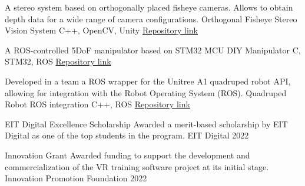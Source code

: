 \documentclass[]{awesome-cv}
\begin{document}
\begin{cventries}
	\cventry
	{A stereo system based on orthogonally placed fisheye cameras. Allows to obtain depth data for a wide range of camera configurations.}
	{Orthogonal Fisheye Stereo Vision System}
	{C++, OpenCV, Unity}
	{\href{https://github.com/QuoZer/fy_lib_source}{Repository link}}%
	{}
	
	\vspace{-3mm}
	\cventry
	{A ROS-controlled 5DoF manipulator based on STM32 MCU}
	{DIY Manipulator}
	{C, STM32, ROS}
	{\href{https://github.com/QuoZer/Tertiarm\_ROS-STM}{Repository link}}%
	{}
	
	
	\vspace{-3mm}
	\cventry
	{Developed in a team a ROS wrapper for the Unitree A1 quadruped robot API, allowing for integration with the Robot Operating System (ROS).}
	{Quadruped Robot ROS integration}
	{C++, ROS}
	{\href{https://github.com/SailorTheMan/unitree\_slam}{Repository link}}
	{ }
	
	\vspace{-5mm}
\end{cventries}


\begin{cvhonors}
	\cvhonor
	{EIT Digital Excellence Scholarship}
	{Awarded a merit-based scholarship by EIT Digital as one of the top students in the program.}
	{EIT Digital}
	{2022}

	\cvhonor
	{Innovation Grant}
	{Awarded funding to support the development and commercialization of the VR training software project at its initial stage.}
	{Innovation Promotion Foundation}
	{2022}

\end{cvhonors}
\ 
\end{document}
